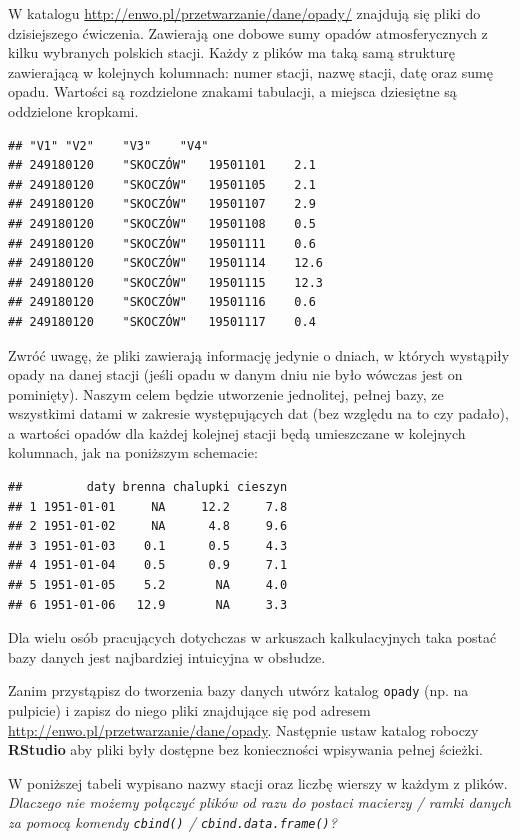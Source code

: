\documentclass[]{book}
\theoremstyle{definition}
\theoremstyle{definition}
\theoremstyle{definition}
\theoremstyle{remark}
\begin{document}
W katalogu \url{http://enwo.pl/przetwarzanie/dane/opady/} znajdują się
pliki do dzisiejszego ćwiczenia. Zawierają one dobowe sumy opadów
atmosferycznych z kilku wybranych polskich stacji. Każdy z plików ma
taką samą strukturę zawierającą w kolejnych kolumnach: numer stacji,
nazwę stacji, datę oraz sumę opadu. Wartości są rozdzielone znakami
tabulacji, a miejsca dziesiętne są oddzielone kropkami.

\begin{verbatim}
## "V1" "V2"    "V3"    "V4"
## 249180120    "SKOCZÓW"   19501101    2.1
## 249180120    "SKOCZÓW"   19501105    2.1
## 249180120    "SKOCZÓW"   19501107    2.9
## 249180120    "SKOCZÓW"   19501108    0.5
## 249180120    "SKOCZÓW"   19501111    0.6
## 249180120    "SKOCZÓW"   19501114    12.6
## 249180120    "SKOCZÓW"   19501115    12.3
## 249180120    "SKOCZÓW"   19501116    0.6
## 249180120    "SKOCZÓW"   19501117    0.4
\end{verbatim}

Zwróć uwagę, że pliki zawierają informację jedynie o dniach, w których
wystąpiły opady na danej stacji (jeśli opadu w danym dniu nie było
wówczas jest on pominięty). Naszym celem będzie utworzenie jednolitej,
pełnej bazy, ze wszystkimi datami w zakresie występujących dat (bez
względu na to czy padało), a wartości opadów dla każdej kolejnej stacji
będą umieszczane w kolejnych kolumnach, jak na poniższym schemacie:

\begin{verbatim}
##         daty brenna chalupki cieszyn
## 1 1951-01-01     NA     12.2     7.8
## 2 1951-01-02     NA      4.8     9.6
## 3 1951-01-03    0.1      0.5     4.3
## 4 1951-01-04    0.5      0.9     7.1
## 5 1951-01-05    5.2       NA     4.0
## 6 1951-01-06   12.9       NA     3.3
\end{verbatim}

Dla wielu osób pracujących dotychczas w arkuszach kalkulacyjnych taka
postać bazy danych jest najbardziej intuicyjna w obsłudze.

Zanim przystąpisz do tworzenia bazy danych utwórz katalog \texttt{opady}
(np. na pulpicie) i zapisz do niego pliki znajdujące się pod adresem
\url{http://enwo.pl/przetwarzanie/dane/opady}. Następnie ustaw katalog
roboczy \textbf{RStudio} aby pliki były dostępne bez konieczności
wpisywania pełnej ścieżki.

W poniższej tabeli wypisano nazwy stacji oraz liczbę wierszy w każdym z
plików. \emph{Dlaczego nie możemy połączyć plików od razu do postaci
macierzy / ramki danych za pomocą komendy \texttt{cbind()} /
\texttt{cbind.data.frame()}?}
\end{document}
